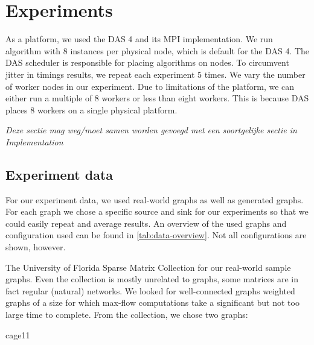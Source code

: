 \chapter{Experiments}
\label{chp:experiments}

As a platform, we used the DAS 4 and its MPI implementation. We run algorithm with 8 instances per physical node, which is default for the DAS 4. %
The DAS scheduler is responsible for placing algorithms on nodes. To circumvent jitter in timings results, we repeat each experiment 5 times. We vary the number of worker nodes in our experiment. Due to limitations of the platform, we can either run a multiple of 8 workers or less than eight workers. This is because DAS places 8 workers on a single physical platform.

\emph{Deze sectie mag weg/moet samen worden gevoegd met een soortgelijke sectie in Implementation}

\section{Experiment data}
For our experiment data, we used real-world graphs as well as generated graphs. For each graph we chose a specific source and sink for our experiments so that we could easily repeat and average results. An overview of the used graphs and configuration used can be found in \autoref{tab:data-overview}. Not all configurations are shown, however.

The University of Florida Sparse Matrix Collection \cite{FloridaSparseMatrix} for our real-world sample graphs. Even the collection is mostly unrelated to graphs, some matrices are in fact regular (natural) networks. We looked for well-connected graphs weighted graphs of a size for which max-flow computations take a significant but not too large time to complete. From the collection, we chose two graphs:
\begin{description}
    \item[cage11]
\end{description}


